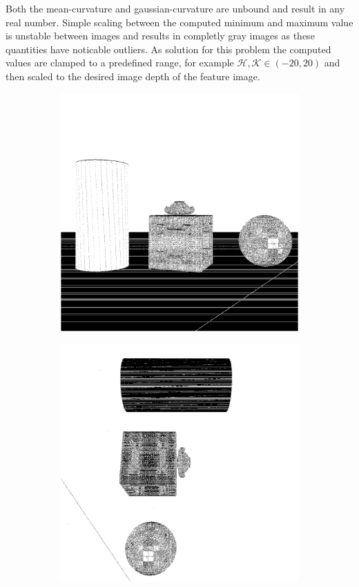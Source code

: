 Both the \gls{mean-curvature} and \gls{gaussian-curvature} are unbound and result in any real number.
Simple scaling between the computed minimum and maximum value is unstable between images and results in completly gray images as these quantities have noticable outliers.
As solution for this problem the computed values are clamped to a predefined range, for example $\mathcal{H},\mathcal{K} \in (-20, 20)$ and then scaled to the desired image depth of the feature image.
\begin{figure}[H]
    \begin{subfigure}[t]{0.32\textwidth}
        \includegraphics[width=\linewidth]{chapter04/img/gauss-0001.png}
    \end{subfigure}
    \begin{subfigure}[t]{0.32\textwidth}
        \includegraphics[width=\linewidth]{chapter04/img/gauss-0030.png}

\end{subfigure}
\end{figure}
